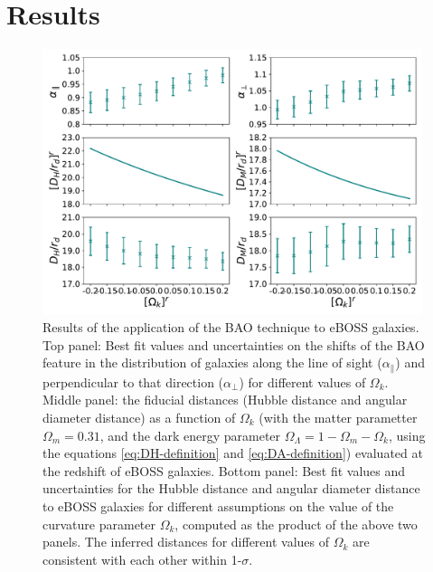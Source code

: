 \chapter{Results}
\label{cha:results}


\begin{figure}[b]
	\centering
	\includegraphics[width=0.99\textwidth]{../figs/phase2_DA_DH_flat.pdf}
%
	\caption[Calculation of the cosmological observables for different fiducial cosmologies.]{Results of the application of the BAO technique to eBOSS galaxies. Top panel: Best fit values and uncertainties on the shifts of the BAO feature in the distribution of galaxies along the line of sight ($\alpha_\parallel$) and perpendicular to that direction ($\alpha_\perp$) for different values of $\Omega_k$. Middle panel: the fiducial distances (Hubble distance and angular diameter distance) as a function of $\Omega_k$ (with the matter parametter $\Omega_m = 0.31$, and the dark energy parameter $\Omega_\Lambda=1 - \Omega_m - \Omega_k$, using the equations \eqref{eq:DH-definition} and \eqref{eq:DA-definition}) evaluated at the redshift of eBOSS galaxies. Bottom panel: Best fit values and uncertainties for the Hubble distance and angular diameter distance to eBOSS galaxies for different assumptions on the value of the curvature parameter $\Omega_k$, computed as the product of the above two panels. The inferred distances for different values of $\Omega_k$ are consistent with each other within 1-$\sigma$.}
	\label{fig:DA_DH}
\end{figure}
